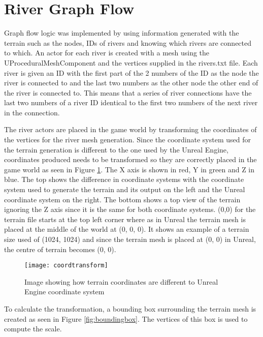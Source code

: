 \section{River Graph Flow}
Graph flow logic was implemented by using information generated with the terrain such as the nodes, IDs of rivers and knowing which rivers are connected to which. An actor for each river is created with a mesh using the UProceduralMeshComponent and the vertices supplied in the rivers.txt file. Each river is given an ID with the first part of the 2 numbers of the ID as the node the river is connected to and the last two numbers as the other node the other end of the river is connected to. This means that a series of river connections have the last two numbers of a river ID identical to the first two numbers of the next river in the connection.
\newline
\par
The river actors are placed in the game world by transforming the coordinates of the vertices for the river mesh generation. Since the coordinate system used for the terrain generation is different to the one used by the Unreal Engine, coordinates produced needs to be transformed so they are correctly placed in the game world as seen in Figure \ref{fig:coordinatesystem}. The X axis is shown in red, Y in green and Z in blue. The top shows the difference in coordinate systems with the coordinate system used to generate the terrain and its output on the left and the Unreal coordinate system on the right. The bottom shows a top view of the terrain ignoring the Z axis since it is the same for both coordinate systems. (0,0) for the terrain file starts at the top left corner where as in Unreal the terrain mesh is placed at the middle of the world at (0, 0, 0). It shows an example of a terrain size used of (1024, 1024) and since the terrain mesh is placed at (0, 0) in Unreal, the centre of terrain becomes (0, 0).
\newline
\par

\begin{figure}[H]
	\texttt{[image: coordtransform]}
	\centering
	\caption{Image showing how terrain coordinates are different to Unreal Engine coordinate system}
	\label{fig:coordinatesystem}
\end{figure}

To calculate the transformation, a bounding box surrounding the terrain mesh is created as seen in Figure \ref{fig:boundingbox}. The vertices of this box is used to compute the scale.
\newline
\par


